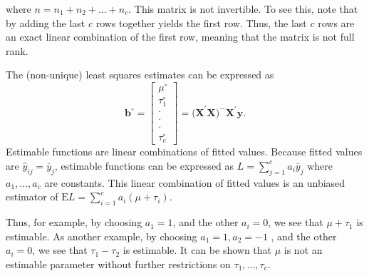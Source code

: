 \noindent where $n=n_1+n_2+\ldots+n_{c}$. This matrix is not
invertible. To see this, note that by adding the last $c$ rows
together yields the first row. Thus, the last $c$ rows are an exact
linear combination of the first row, meaning that the matrix is not
full rank.

The (non-unique) least squares estimates can be expressed as
\begin{equation*}
\mathbf{b}^{\circ }=%
\begin{bmatrix}
\mu ^{\circ } \\
\tau_1^{\circ } \\
\cdot  \\
\cdot  \\
\cdot  \\
\tau_c^{\circ }%
\end{bmatrix}%
=\mathbf{(X}^{\prime}\mathbf{X)}^{-}\mathbf{X}^{\prime}\mathbf{y.}
\end{equation*}
Estimable functions are linear combinations of fitted values.
Because fitted values are $\hat{y}_{ij}=\bar{y}_{j}$, estimable
functions can be expressed as $ L=\sum_{j=1}^{c}a_i\bar{y}_{j} $
where $a_1,\ldots,a_{c}$ are constants. This linear combination of
fitted values is an unbiased estimator of $\text{E
}L=\sum_{i=1}^{c}a_i(\mu +\tau_i). $

Thus, for example, by choosing $a_1=1$, and the other $a_i=0$, we
see that $\mu
+\tau_1$ is estimable. As another example, by choosing $a_1=1,a_2=-1$%
, and the other $a_i=0$, we see that $\tau_1-\tau_2$ is estimable.
It can be shown that $\mu $ is not an estimable parameter without
further restrictions on $\tau_1,\ldots,\tau_c$.
